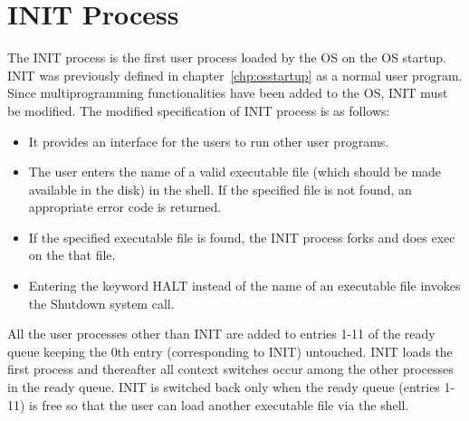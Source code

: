 \documentclass[10pt]{report}
\begin{document}
\section{INIT Process}
The INIT process is the first user process loaded by the OS on the OS startup. INIT was previously defined in chapter~\ref{chp:osstartup} as a normal user program. Since multiprogramming functionalities have been added to the OS, INIT must be modified. The modified specification of INIT process is as follows:
\begin{itemize}
	\item  It provides an interface for the users to run other user programs.
	\item The user enters the name of a valid executable file (which should be made available in the disk) in the shell. If the specified file is not found, an appropriate error code is returned.
	\item If the specified executable file is found, the INIT process forks and does exec on the that file.
	\item Entering the keyword HALT instead of the name of an executable file invokes the Shutdown system call.
\end{itemize}

All the user processes other than INIT are added to entries 1-11 of the ready queue keeping the 0th entry (corresponding to INIT) untouched. INIT loads the first process and thereafter all context switches occur among the other processes in the ready queue. INIT is switched back only when the ready queue (entries 1-11) is free so that the user can load another executable file via the shell. 

% 
% 
\end{document}
